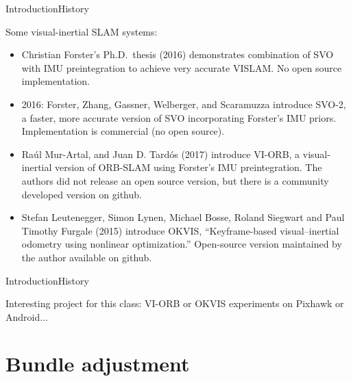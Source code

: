 \documentclass[aspectratio=169]{beamer}
\begin{document}
\begin{frame}{Introduction}{History}

  Some visual-inertial SLAM systems:
  \begin{itemize}
    \item Christian Forster's Ph.D.\ thesis (2016) demonstrates combination of
      SVO with IMU preintegration to achieve very accurate VISLAM. No
      open source implementation.
    \item 2016: Forster, Zhang, Gassner, Welberger, and Scaramuzza
      introduce \alert{SVO-2}, a faster, more accurate version of
      SVO incorporating Forster's IMU priors. Implementation is commercial
      (no open source).
    \item Ra\'{u}l Mur-Artal, and Juan D. Tard\'{o}s (2017) introduce
      \alert{VI-ORB}, a visual-inertial version of ORB-SLAM using Forster's
      IMU preintegration. The authors did not
      release an open source version, but there is a community developed
      version on github.
    \item Stefan Leutenegger, Simon Lynen, Michael Bosse,
      Roland Siegwart and Paul Timothy Furgale (2015) introduce \alert{OKVIS},
      ``Keyframe-based visual–inertial odometry using nonlinear optimization.''
      Open-source version maintained by the author available on github.
  \end{itemize}

\end{frame}


\begin{frame}{Introduction}{History}

  Interesting project for this class: VI-ORB or OKVIS experiments on
  Pixhawk or Android...

\end{frame}

\section{Bundle adjustment}
\end{document}
